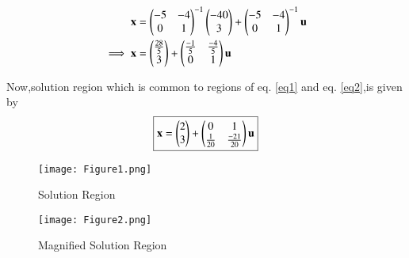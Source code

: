 \documentclass[journal,12pt,twocolumn]{IEEEtran}
\begin{document}
\begin{enumerate}
    \begin{align}
        \mathbf{x} &= \begin{pmatrix}-5 & -4 \\0 & 1\end{pmatrix}^{-1}\begin{pmatrix}-40 \\ 3\end{pmatrix} + \begin{pmatrix}-5 & -4 \\0 & 1\end{pmatrix}^{-1}\mathbf{u}
        \\
        \implies \mathbf{x} &= \begin{pmatrix}\frac{28}{5} \\3\end{pmatrix} + \begin{pmatrix}\frac{-1}{5} & \frac{-4}{5}\\ 0 & 1\end{pmatrix}\mathbf{u} \label{eq2}
    \end{align}
    
\end{enumerate}
Now,solution region which is common to regions of eq. \eqref{eq1} and eq. \eqref{eq2},is given by
\begin{align}
    \boxed{\mathbf{x} = \begin{pmatrix}2 \\ 3\end{pmatrix}+\begin{pmatrix}0 & 1\\ \frac{1}{20} & \frac{-21}{20}\end{pmatrix}\mathbf{u}}
\end{align}

\begin{figure}[!ht]
\centering
\texttt{[image: Figure1.png]}
\caption{Solution Region}
\label{fig:fig1}	
\end{figure}

\begin{figure}[!ht]
\centering
\texttt{[image: Figure2.png]}
\caption{Magnified Solution Region}
\label{fig:fig2}	
\end{figure}
\end{document}
